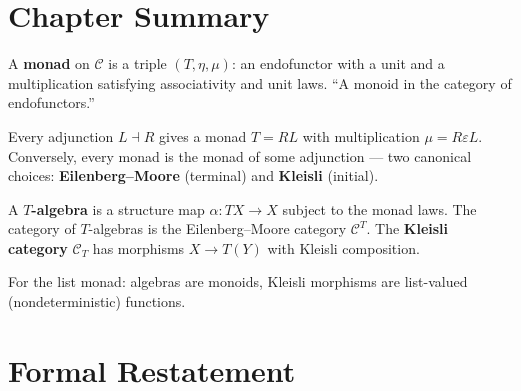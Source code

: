 \begin{exercisesbox}
\begin{qa}
\end{qa}
\end{exercisesbox}


\section*{Chapter Summary}

\begin{summarybox}
A \textbf{monad} on $\mathcal{C}$ is a triple $(T, \eta, \mu)$: an
endofunctor with a unit and a multiplication satisfying associativity
and unit laws. ``A monoid in the category of endofunctors.''

Every adjunction $L \dashv R$ gives a monad $T = R L$ with multiplication
$\mu = R \varepsilon L$. Conversely, every monad is the monad of some
adjunction --- two canonical choices: \textbf{Eilenberg--Moore} (terminal)
and \textbf{Kleisli} (initial).

A \textbf{$T$-algebra} is a structure map $\alpha : T X \to X$ subject to
the monad laws. The category of $T$-algebras is the Eilenberg--Moore
category $\mathcal{C}^T$. The \textbf{Kleisli category} $\mathcal{C}_T$
has morphisms $X \to T(Y)$ with Kleisli composition.

For the list monad: algebras are monoids, Kleisli morphisms are
list-valued (nondeterministic) functions.
\end{summarybox}


\section*{Formal Restatement}

